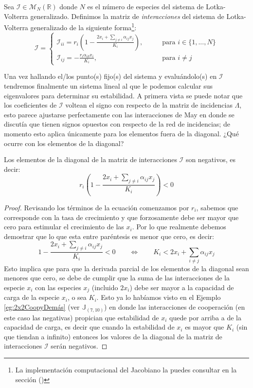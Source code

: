 \begin{definición}\label{def:MatrizInteracciones}
	Sea $\mathcal{I}\in\mathcal{M}_N(\mathbb{R})$ donde $N$ es el número de especies del sistema de Lotka-Volterra generalizado. Definimos la matriz de \textit{interacciones} del sistema de Lotka-Volterra generalizado de la siguiente forma\footnote{La implementación computacional del Jacobiano la puedes consultar en la sección ()}:
	\begin{equation}\label{eqn:MartizInteracciones}
		\mathcal{I}=\begin{cases}
			\mathcal{I}_{ii} = r_i \left (1-\frac{2x_i+\sum_{j\neq i}\alpha_{ij}x_j}{K_i}\right ),\qquad&\text{para }i\in\{1,...,N\}\\
			\mathcal{I}_{ij} = -\frac{r_i\alpha_{ik}x_i}{K_i},\qquad&\text{para }i\neq j
		\end{cases}
	\end{equation}
\end{definición}
Una vez hallando el/los punto(s) fijo(s) del sistema y evaluándolo(s) en $\mathcal{I}$ tendremos finalmente un sistema lineal al que le podemos calcular sus eigenvalores para determinar su estabilidad. A primera vista se puede notar que los coeficientes de $\mathcal{I}$ voltean el signo con respecto de la matriz de incidencias $\Lambda$, esto parece ajustarse perfectamente con las interacciones de May en donde se discutía que tienen signos opuestos con respecto de la red de incidencias; de momento esto aplica únicamente para los elementos fuera de la diagonal. ¿Qué ocurre con los elementos de la diagonal?
\begin{proposición}\label{prop:DiagonalI}
	Los elementos de la diagonal de la matriz de interacciones $\mathcal{I}$ son negativos, es decir:
	$$
	r_i \left (1-\frac{2x_i+\sum_{j\neq i}\alpha_{ij}x_j}{K_i}\right )<0
	$$	
	\begin{proof}
		Revisando los términos de la ecuación comenzamos por $r_i$, sabemos que corresponde con la tasa de crecimiento y que forzosamente debe ser mayor que cero para estimular el crecimiento de las $x_i$. Por lo que realmente debemos demostrar que lo que esta entre paréntesis es menor que cero, es decir:
		$$
		1-\frac{2x_i+\sum_{j\neq i}\alpha_{ij}x_j}{K_i}<0\qquad\Longleftrightarrow\qquad K_i<2x_i+\sum_{i\neq j}\alpha_{ij}x_j
		$$
		Esto implica que para que la derivada parcial de los elementos de la diagonal sean menores que cero, se debe de cumplir que la suma de las interacciones de la especie $x_i$ con las especies $x_j$ (incluido $2x_i$) debe ser mayor a la capacidad de carga de la especie $x_i$, o sea $K_i$. Esto ya lo habíamos visto en el Ejemplo \ref{eg:2x2CoopyDemás} (ver $\mathbb{J}_{(7,10)}$) en donde las interacciones de cooperación (en este caso las negativas) propician que estabilidad de $x_i$ quede por arriba a de la capacidad de carga, es decir que cuando la estabilidad de $x_i$ es mayor que $K_i$ (sin que tiendan a infinito) entonces los valores de la diagonal de la matriz de interacciones $\mathcal{I}$ serán negativos.
	\end{proof}
\end{proposición}
